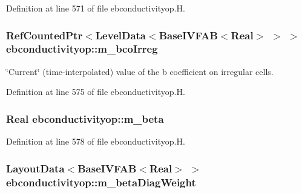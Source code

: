 Definition at line 571 of file ebconductivityop.\+H.

\subsubsection[{\texorpdfstring{m\+\_\+bco\+Irreg}{m_bcoIrreg}}]{\setlength{\rightskip}{0pt plus 5cm}Ref\+Counted\+Ptr$<$Level\+Data$<$Base\+I\+V\+F\+AB$<$Real$>$ $>$ $>$ ebconductivityop\+::m\+\_\+bco\+Irreg\hspace{0.3cm}{\ttfamily [protected]}}\hypertarget{classebconductivityop_a9165c00d7f28d242fdb5772ebb59a0d1}{}\label{classebconductivityop_a9165c00d7f28d242fdb5772ebb59a0d1}
\char`\"{}\+Current\char`\"{} (time-\/interpolated) value of the b coefficient on irregular cells. 

Definition at line 575 of file ebconductivityop.\+H.

\subsubsection[{\texorpdfstring{m\+\_\+beta}{m_beta}}]{\setlength{\rightskip}{0pt plus 5cm}Real ebconductivityop\+::m\+\_\+beta\hspace{0.3cm}{\ttfamily [protected]}}\hypertarget{classebconductivityop_af73e640bc0b6f941bf843361a4d3c41a}{}\label{classebconductivityop_af73e640bc0b6f941bf843361a4d3c41a}


Definition at line 578 of file ebconductivityop.\+H.

\subsubsection[{\texorpdfstring{m\+\_\+beta\+Diag\+Weight}{m_betaDiagWeight}}]{\setlength{\rightskip}{0pt plus 5cm}Layout\+Data$<$Base\+I\+V\+F\+AB$<$Real$>$ $>$ ebconductivityop\+::m\+\_\+beta\+Diag\+Weight\hspace{0.3cm}{\ttfamily [protected]}}\hypertarget{classebconductivityop_a44118f56509ff608e9b7461d32c22d1e}{}\label{classebconductivityop_a44118f56509ff608e9b7461d32c22d1e}


